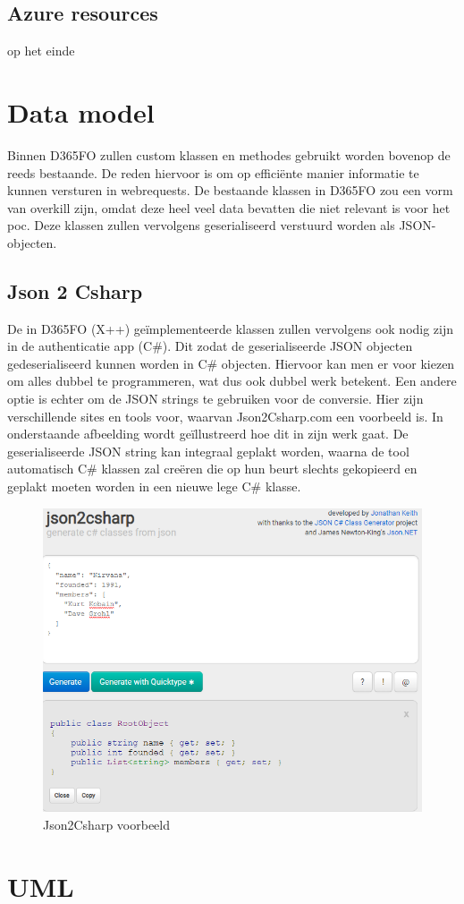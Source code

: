 \subsection{Azure resources}
op het einde
\section{Data model}
Binnen D365FO zullen custom klassen en methodes gebruikt worden bovenop de reeds bestaande. De reden hiervoor is om op efficiënte manier informatie te kunnen versturen in webrequests. De bestaande klassen in D365FO zou een vorm van overkill zijn, omdat deze heel veel data bevatten die niet relevant is voor het poc. Deze klassen zullen vervolgens geserialiseerd verstuurd worden als JSON-objecten. 

\subsection{Json 2 Csharp}
De in D365FO (X++) geïmplementeerde klassen zullen vervolgens ook nodig zijn in de authenticatie app (C\#). Dit zodat de geserialiseerde JSON objecten gedeserialiseerd kunnen worden in C\# objecten. Hiervoor kan men er voor kiezen om alles dubbel te programmeren, wat dus ook dubbel werk betekent. Een andere optie is echter om de JSON strings te gebruiken voor de conversie. Hier zijn verschillende sites en tools voor, waarvan Json2Csharp.com een voorbeeld is. 
In onderstaande afbeelding wordt geïllustreerd hoe dit in zijn werk gaat. De geserialiseerde JSON string kan integraal geplakt worden, waarna de tool automatisch C\# klassen zal creëren die op hun beurt slechts gekopieerd en geplakt moeten worden in een nieuwe lege C\# klasse. 
\begin{figure}[H]
    \centering
    \includegraphics[width=1\textwidth]{img/json2Csharp.png}
    \caption{Json2Csharp voorbeeld}
\end{figure}

\section{UML}